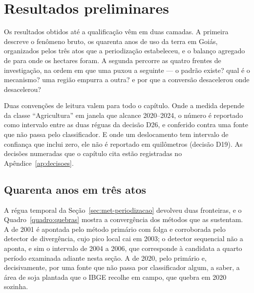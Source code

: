 \chapter{Resultados preliminares}
\label{cap:resultados}

Os resultados obtidos até a qualificação vêm em duas camadas. A primeira
descreve o fenômeno bruto, os quarenta anos de uso da terra em Goiás,
organizados pelos três atos que a periodização estabeleceu, e o balanço
agregado de para onde os hectares foram. A segunda percorre as quatro frentes
de investigação, na ordem em que uma puxou a seguinte --- o padrão existe?
qual é o mecanismo? uma região empurra a outra? e por que a conversão
desacelerou onde desacelerou?

Duas convenções de leitura valem para todo o capítulo. Onde a medida depende
da classe ``Agricultura'' em janela que alcance 2020--2024, o número é
reportado como intervalo entre as duas réguas da decisão D26, e conferido
contra uma fonte que não passa pelo classificador. E onde um deslocamento
tem intervalo de confiança que inclui zero, ele não é reportado em
quilômetros (decisão D19). As decisões numeradas que o capítulo cita estão
registradas no Apêndice~\ref{ap:decisoes}.

\section{Quarenta anos em três atos}
\label{sec:res-atos}

A régua temporal da Seção~\ref{sec:met-periodizacao} devolveu duas fronteiras,
e o Quadro~\ref{quadro:quebras} mostra a convergência dos métodos que as
sustentam. A de 2001 é apontada pelo método primário com folga e corroborada
pelo detector de divergência, cujo pico local cai em 2003; o detector
sequencial não a aponta, e sim o intervalo de 2004 a 2006, que corresponde à
candidata a quarto período examinada adiante nesta seção. A de 2020, pelo primário e,
decisivamente, por uma fonte que não passa por classificador algum, a saber, a
área de soja plantada que o IBGE recolhe em campo, que quebra em 2020 sozinha.

